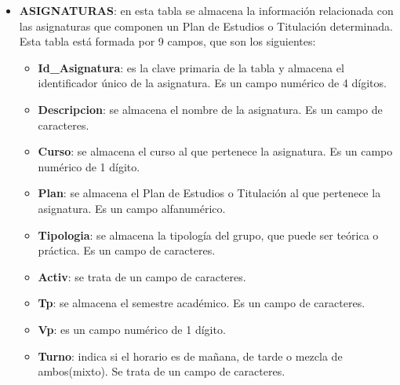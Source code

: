 \begin{itemize}
\item
\textbf{ASIGNATURAS}: en esta tabla se almacena la información relacionada con las asignaturas que componen un Plan de Estudios o Titulación determinada. Esta tabla está formada por 9 campos, que son los siguientes:
\begin{itemize}
\item
\textbf{Id\_Asignatura}: es la clave primaria de la tabla y almacena el identificador único de la asignatura. Es un campo numérico de 4 dígitos.
\item
\textbf{Descripcion}: se almacena el nombre de la asignatura. Es un campo de caracteres.
\item
\textbf{Curso}: se almacena el curso al que pertenece la asignatura. Es un campo numérico de 1 dígito.
\item
\textbf{Plan}: se almacena el Plan de Estudios o Titulación al que pertenece la asignatura. Es un campo alfanumérico.
\item
\textbf{Tipologia}: se almacena la tipología del grupo, que puede ser teórica o práctica. Es un campo de caracteres.
\item
\textbf{Activ}: se trata de un campo de caracteres.
\item
\textbf{Tp}: se almacena el semestre académico. Es un campo de caracteres.
\item
\textbf{Vp}: es un campo numérico de 1 dígito.
\item
\textbf{Turno}: indica si el horario es de mañana, de tarde o mezcla de ambos(mixto). Se trata de un campo de caracteres.
\end{itemize}







\end{itemize}
